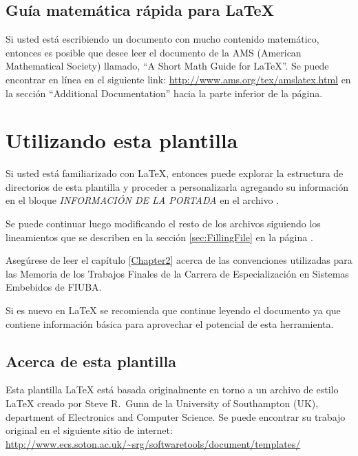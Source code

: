 \subsection{Guía matemática rápida para \LaTeX{}}

Si usted está escribiendo un documento con mucho contenido matemático, entonces es posible que desee leer el documento de la AMS (American Mathematical Society) llamado, \enquote{A Short Math Guide for \LaTeX{}}. Se puede encontrar en línea en el siguiente link: \url{http://www.ams.org/tex/amslatex.html} en la sección \enquote{Additional Documentation} hacia la parte inferior de la página.



\section{Utilizando esta plantilla}

Si usted está familiarizado con \LaTeX{}, entonces puede explorar la estructura de directorios de esta plantilla y proceder a personalizarla agregando su información en el bloque \emph{INFORMACIÓN DE LA PORTADA} en el archivo .  

Se puede continuar luego modificando el resto de los archivos siguiendo los lineamientos que se describen en la sección \ref{sec:FillingFile} en la página \pageref{sec:FillingFile}.

Asegúrese de leer el capítulo \ref{Chapter2} acerca de las convenciones utilizadas para las Memoria de los Trabajos Finales de la Carrera de Especialización en Sistemas Embebidos de FIUBA.

Si es nuevo en \LaTeX{} se recomienda que continue leyendo el documento ya que contiene información básica para aprovechar el potencial de esta herramienta.


\subsection{Acerca de esta plantilla}

Esta plantilla \LaTeX{} está basada originalmente en torno a un archivo de estilo \LaTeX{} creado por Steve R.\ Gunn de la  University of Southampton (UK), department of Electronics and Computer Science. Se puede encontrar su trabajo original en el siguiente sitio de internet:
\url{http://www.ecs.soton.ac.uk/~srg/softwaretools/document/templates/}

